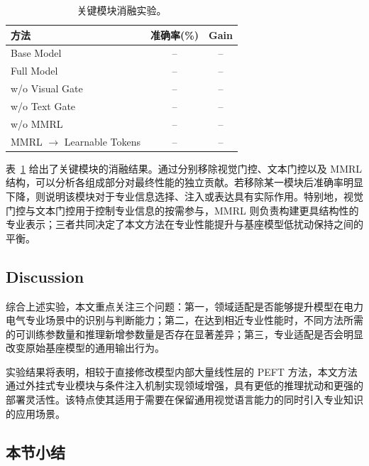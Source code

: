 \documentclass[journal]{IEEEtran}
\begin{document}
\begin{table}[htbp]
\centering
\caption{关键模块消融实验。}
\label{tab:ablation}
\begin{tabular}{lcc}
\toprule
方法 & 准确率(\%) & Gain \\
\midrule
Base Model & -- & -- \\
Full Model & -- & -- \\
w/o Visual Gate & -- & -- \\
w/o Text Gate & -- & -- \\
w/o MMRL & -- & -- \\
MMRL $\rightarrow$ Learnable Tokens & -- & -- \\
\bottomrule
\end{tabular}
\end{table}

表~\ref{tab:ablation} 给出了关键模块的消融结果。通过分别移除视觉门控、文本门控以及 MMRL 结构，可以分析各组成部分对最终性能的独立贡献。若移除某一模块后准确率明显下降，则说明该模块对于专业信息选择、注入或表达具有实际作用。特别地，视觉门控与文本门控用于控制专业信息的按需参与，MMRL 则负责构建更具结构性的专业表示；三者共同决定了本文方法在专业性能提升与基座模型低扰动保持之间的平衡。

\subsection{Discussion}

综合上述实验，本文重点关注三个问题：第一，领域适配是否能够提升模型在电力电气专业场景中的识别与判断能力；第二，在达到相近专业性能时，不同方法所需的可训练参数量和推理新增参数量是否存在显著差异；第三，专业适配是否会明显改变原始基座模型的通用输出行为。

实验结果将表明，相较于直接修改模型内部大量线性层的 PEFT 方法，本文方法通过外挂式专业模块与条件注入机制实现领域增强，具有更低的推理扰动和更强的部署灵活性。该特点使其适用于需要在保留通用视觉语言能力的同时引入专业知识的应用场景。

\subsection{本节小结}
\end{document}
